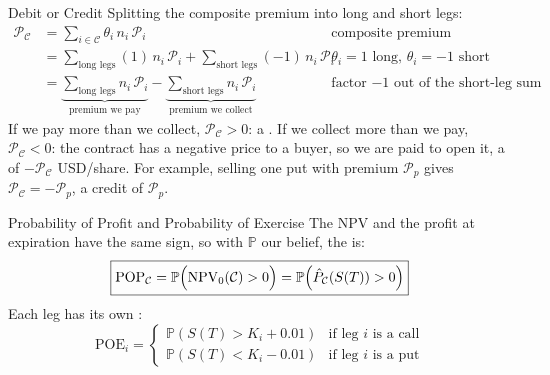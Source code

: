 \documentclass[aspectratio=169,11pt]{beamer}
\newcommand{\Cc}{\mathcal{C}}
\newcommand{\Pc}{\mathcal{P}}
\begin{document}
\begin{frame}{Debit or Credit}
  Splitting the composite premium into long and short legs:
  \begin{align*}
    \Pc_{\Cc} &= \sum_{i\in\Cc}\theta_{i}\,n_{i}\,\Pc_{i} && \text{composite premium}\\
    &= \sum_{\text{long legs}}(1)\,n_{i}\,\Pc_{i}+\sum_{\text{short legs}}(-1)\,n_{i}\,\Pc_{i} && \theta_{i}=1 \text{ long, } \theta_{i}=-1 \text{ short}\\
    &= \underbrace{\sum_{\text{long legs}}n_{i}\,\Pc_{i}}_{\textstyle\text{premium we pay}}-\underbrace{\sum_{\text{short legs}}n_{i}\,\Pc_{i}}_{\textstyle\text{premium we collect}} && \text{factor }{-1}\text{ out of the short-leg sum}
  \end{align*}
  If we pay more than we collect, $\Pc_{\Cc}>0$: a . If we collect
  more than we pay, $\Pc_{\Cc}<0$: the contract has a negative price to a buyer,
  so we are paid to open it, a  of $-\Pc_{\Cc}$ USD/share. For
  example, selling one put with premium $\Pc_{p}$ gives $\Pc_{\Cc}=-\Pc_{p}$, a
  credit of $\Pc_{p}$.
\end{frame}

\begin{frame}{Probability of Profit and Probability of Exercise}
  The NPV and the profit at expiration have the same sign, so with $\mathbb{P}$
  our belief, the  is:
  \begin{equation*}
    \boxed{\text{POP}_{\Cc} = \mathbb{P}\Bigl(\operatorname{NPV}_{0}(\Cc)>0\Bigr) = \mathbb{P}\Bigl(\hat{P}_{\Cc}(S(T))>0\Bigr)}
  \end{equation*}
  Each leg has its own :
  \begin{equation*}
    \text{POE}_{i} = \begin{cases}
      \mathbb{P}\left(S(T)>K_{i}+0.01\right) & \text{if leg } i \text{ is a call}\\
      \mathbb{P}\left(S(T)<K_{i}-0.01\right) & \text{if leg } i \text{ is a put}
    \end{cases}
  \end{equation*}
\end{frame}
\end{document}
